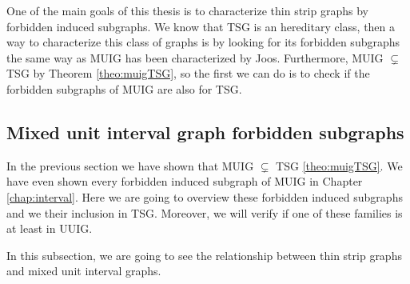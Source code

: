 One of the main goals of this thesis is to characterize thin strip graphs by forbidden induced subgraphs. We know that TSG is an hereditary class, then a way to characterize this class of graphs is by looking for its forbidden subgraphs the same way as MUIG has been characterized by Joos. Furthermore, MUIG $\subsetneq$ TSG by Theorem \ref{theo:muigTSG}, so the first we can do is to check if the forbidden subgraphs of MUIG are also for TSG.


\subsection{Mixed unit interval graph forbidden subgraphs}

In the previous section we have shown that MUIG $\subsetneq$ TSG \ref{theo:muigTSG}. We have even shown every forbidden induced subgraph of MUIG in Chapter \ref{chap:interval}. Here we are going to overview these forbidden induced subgraphs and we their inclusion in TSG. Moreover, we will verify if one of these families is at least in UUIG.

In this subsection, we are going to see the relationship between thin strip graphs and mixed unit interval graphs.


